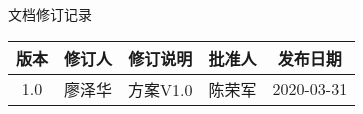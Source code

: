 \newpage
\begin{center}
{\songti \subsubTitle 文档修订记录} \par

\setlength{\arrayrulewidth}{1.2pt} %
\setlength{\tabcolsep}{18pt} %
\renewcommand{\arraystretch}{1.5}  %

\songti\tableText
\begin{tabular}{ |c | c| c| c|  c |}
  \hline
  版本  & 修订人 & 修订说明 & 批准人 & 发布日期 \\
  \hline
  1.0 &  廖泽华 & 方案V1.0 & 陈荣军 & 2020-03-31 \\
  \hline
\end{tabular}
\end{center}
